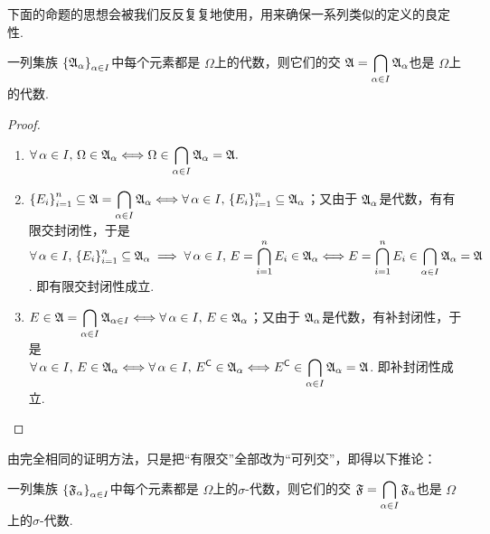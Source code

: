 下面的命题的思想会被我们反反复复地使用，用来确保一系列类似的定义的良定性.
\begin{proposition}\label{生成代数良定性}
    一列集族 $\left\{ {\mathfrak{A}}_\alpha \right\}_{\alpha\in I}$中每个元素都是 $\Omega$上的代数，则它们的交 ${\mathfrak{A}}=\displaystyle \bigcap_{\alpha\in I} {\mathfrak{A}}_\alpha$也是 $\Omega$上的代数.
\end{proposition}
\begin{proof}
    \begin{enumerate}
        \item $\forall\,\alpha\in I,\,\Omega\in{\mathfrak{A}}_\alpha \Longleftrightarrow \Omega\in\displaystyle\bigcap_{\alpha\in I} {\mathfrak{A}}_\alpha={\mathfrak{A}}.$
        \item $\left\{E_i\right\}_{i=1}^n\subseteq{\mathfrak{A}}=\displaystyle\bigcap_{\alpha\in I} {\mathfrak{A}}_\alpha\Longleftrightarrow\forall\,\alpha\in I,\,\left\{E_i\right\}_{i=1}^n\subseteq{\mathfrak{A}}_\alpha$；又由于 ${\mathfrak{A}}_\alpha$是代数，有有限交封闭性，于是 $\forall\,\alpha\in I,\,\left\{E_i\right\}_{i=1}^n\subseteq{\mathfrak{A}}_\alpha\implies\displaystyle\forall\,\alpha\in I,\, E=\bigcap_{i=1}^n E_i\in{\mathfrak{A}}_\alpha\Longleftrightarrow E=\bigcap_{i=1}^n E_i\in\bigcap_{\alpha\in I} {\mathfrak{A}}_\alpha ={\mathfrak{A}}$. 即有限交封闭性成立.
        \item $E\in\displaystyle {\mathfrak{A}}=\bigcap_{\alpha\in I} {\mathfrak{A}}_{\alpha\in I}\Longleftrightarrow \forall\,\alpha\in I,\,E\in{\mathfrak{A}}_\alpha$；又由于 ${\mathfrak{A}}_\alpha$是代数，有补封闭性，于是 \\ $\displaystyle \forall\,\alpha\in I,\,E\in{\mathfrak{A}}_\alpha\Longleftrightarrow\forall\,\alpha\in I,\,E^{\mathsf{C}}\in{\mathfrak{A}}_\alpha\Longleftrightarrow E^{\mathsf{C}}\in\bigcap_{\alpha\in I} {\mathfrak{A}}_\alpha ={\mathfrak{A}}$. 即补封闭性成立.
    \end{enumerate}
\end{proof}
由完全相同的证明方法，只是把“有限交”全部改为“可列交”，即得以下推论：
\begin{corollary}\label{生成sigma代数良定性}
    一列集族 $\left\{ {\mathfrak{F}}_\alpha \right\}_{\alpha\in I}$中每个元素都是 $\Omega$上的$\sigma$-代数，则它们的交 ${\mathfrak{F}}=\displaystyle \bigcap_{\alpha\in I} {\mathfrak{F}}_\alpha$也是 $\Omega$上的$\sigma$-代数.
\end{corollary}
\vspace{0.5cm}

